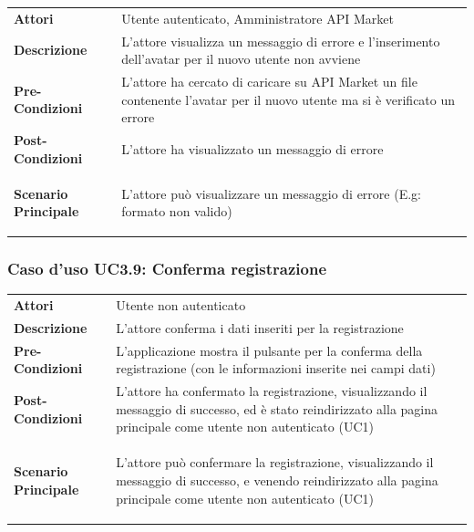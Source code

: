 \begin{minipage}{\linewidth}
	\begin{tabular}{ l | p{11cm}}
		\hline
		\rowcolor{Gray}
		\multicolumn{2}{c}{UC3.8 - Errore inserimento avatar} \\
		\hline
		\textbf{Attori} & Utente autenticato, Amministratore API Market \\
		\textbf{Descrizione} & L'attore visualizza un messaggio di errore e l'inserimento dell'avatar per il nuovo utente non avviene \\
		\textbf{Pre-Condizioni} & L'attore ha cercato di caricare su API Market un file contenente l'avatar per il nuovo utente ma si è verificato un errore \\
		\textbf{Post-Condizioni} & L'attore ha visualizzato un messaggio di errore \\
		\textbf{Scenario Principale} & 
		\begin{enumerate*}[label=(\arabic*.),itemjoin={\newline}]
			\item L'attore può visualizzare un messaggio di errore (E.g: formato non valido)
		\end{enumerate*}\\
	\end{tabular}
\end{minipage}

\subsubsection{Caso d'uso UC3.9: Conferma registrazione}
\label{UC3_9}

\begin{longtable}{ l | p{11cm}}
	\hline
	\rowcolor{Gray}
	 \multicolumn{2}{c}{UC3.9 - Conferma registrazione} \\
	 \hline
	\textbf{Attori} & Utente non autenticato \\
	\textbf{Descrizione} & L'attore conferma i dati inseriti per la registrazione \\
	\textbf{Pre-Condizioni} & L'applicazione mostra il pulsante per la conferma della registrazione (con le informazioni inserite nei campi dati) \\
	\textbf{Post-Condizioni} & L'attore ha confermato la registrazione, visualizzando il messaggio di successo, ed è stato reindirizzato alla pagina principale come utente non autenticato (UC1) \\
	\textbf{Scenario Principale} & 
	\begin{enumerate*}[label=(\arabic*.),itemjoin={\newline}]
		\item L'attore può confermare la registrazione, visualizzando il messaggio di successo, e venendo reindirizzato alla pagina principale come utente non autenticato (UC1)
	\end{enumerate*}\\
\end{longtable}

